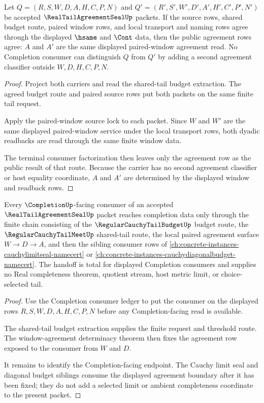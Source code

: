 \begin{theorem}
\label{thm:real-tail-agreement-seal-window-agreement-determinacy}
Let $Q=(R,S,W,D,A,H,C,P,N)$ and $Q'=(R',S',W',D',A',H',C',P',N')$ be accepted $\RealTailAgreementSealUp$ packets. If the source rows, shared budget route, paired window rows, and local transport and naming rows agree through the displayed $\hsame$ and $\Cont$ data, then the public agreement rows agree: $A$ and $A'$ are the same displayed paired-window agreement read. No Completion consumer can distinguish $Q$ from $Q'$ by adding a second agreement classifier outside $W,D,H,C,P,N$.
\end{theorem}
\begin{proof}
Project both carriers and read the shared-tail budget extraction. The agreed budget route and paired source rows put both packets on the same finite tail request.

Apply the paired-window source lock to each packet. Since $W$ and $W'$ are the same displayed paired-window service under the local transport rows, both dyadic readbacks are read through the same finite window data.

The terminal consumer factorization then leaves only the agreement row as the public result of that route. Because the carrier has no second agreement classifier or host equality coordinate, $A$ and $A'$ are determined by the displayed window and readback rows.
\end{proof}

\begin{theorem}
\label{thm:real-tail-agreement-seal-completion-handoff-totality}
Every $\CompletionUp$-facing consumer of an accepted $\RealTailAgreementSealUp$ packet reaches completion data only through the finite chain consisting of the $\RegularCauchyTailBudgetUp$ budget route, the $\RegularCauchyTailMeetUp$ shared-tail route, the local paired agreement surface $W \to D \to A$, and then the sibling consumer rows of \autoref{ch:concrete-instances-cauchylimitseal-namecert} or \autoref{ch:concrete-instances-cauchydiagonalbudget-namecert}. The handoff is total for displayed Completion consumers and supplies no Real completeness theorem, quotient stream, host metric limit, or choice-selected tail.
\end{theorem}
\begin{proof}
Use the Completion consumer ledger to put the consumer on the displayed rows $R,S,W,D,A,H,C,P,N$ before any Completion-facing read is available.

The shared-tail budget extraction supplies the finite request and threshold route. The window-agreement determinacy theorem then fixes the agreement row exposed to the consumer from $W$ and $D$.

It remains to identify the Completion-facing endpoint. The Cauchy limit seal and diagonal budget siblings consume the displayed agreement boundary after it has been fixed; they do not add a selected limit or ambient completeness coordinate to the present packet.
\end{proof}


